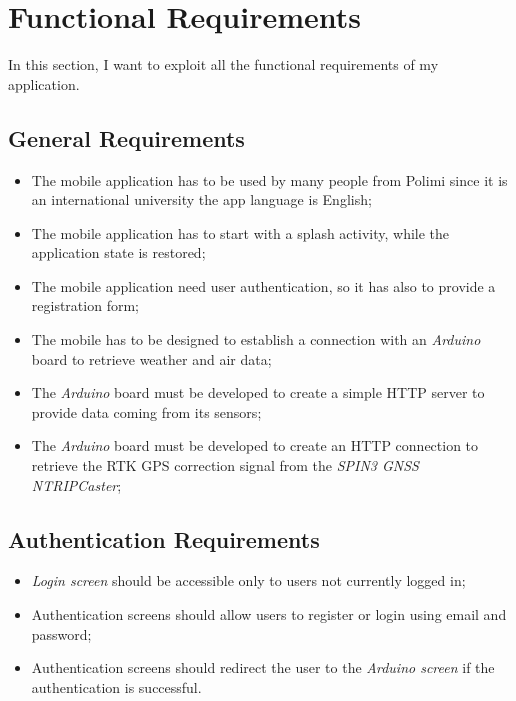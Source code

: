 \section{Functional Requirements}
In this section, I want to exploit all the functional requirements of my application.

\subsection{General Requirements}
\begin{itemize}
    \item The mobile application has to be used by many people from Polimi since it is an international university the app language is English;
    \item The mobile application has to start with a splash activity, while the application state is restored;
    \item The mobile application need user authentication, so it has also to provide a registration form;
    \item The mobile has to be designed to establish a connection with an \textit{Arduino} board to retrieve weather and air data;
    \item The \textit{Arduino} board must be developed to create a simple HTTP server to provide data coming from its sensors;
    \item The \textit{Arduino} board must be developed to create an HTTP connection to retrieve the RTK GPS correction signal from the \textit{SPIN3 GNSS NTRIPCaster};
\end{itemize}

\subsection{Authentication Requirements}
\begin{itemize}
    \item \textit{Login screen} should be accessible only to users not currently logged in;
    \item Authentication screens should allow users to register or login using email and password;
    \item Authentication screens should redirect the user to the \textit{Arduino screen} if the authentication is successful.
\end{itemize}
    
